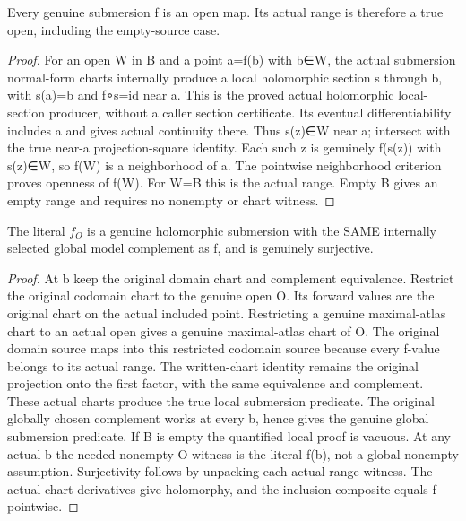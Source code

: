 \begin{lemma}
\label{hir:submersion-image-trace-open}
\leanok
{}
Every genuine submersion f is an open map. Its actual range is therefore a true open, including the empty-source case.
\end{lemma}
\begin{proof}
For an open W in B and a point a=f(b) with b∈W, the actual submersion normal-form charts internally produce a local holomorphic section s through b, with s(a)=b and f∘s=id near a. This is the proved actual holomorphic local-section producer, without a caller section certificate. Its eventual differentiability includes a and gives actual continuity there. Thus s(z)∈W near a; intersect with the true near-a projection-square identity. Each such z is genuinely f(s(z)) with s(z)∈W, so f(W) is a neighborhood of a. The pointwise neighborhood criterion proves openness of f(W). For W=B this is the actual range. Empty B gives an empty range and requires no nonempty or chart witness.
\end{proof}

\begin{lemma}
\label{hir:submersion-image-trace-charts}
\leanok
{}
The literal $f_O$ is a genuine holomorphic submersion with the SAME internally selected global model complement as f, and is genuinely surjective.
\end{lemma}
\begin{proof}
At b keep the original domain chart and complement equivalence. Restrict the original codomain chart to the genuine open O. Its forward values are the original chart on the actual included point. Restricting a genuine maximal-atlas chart to an actual open gives a genuine maximal-atlas chart of O. The original domain source maps into this restricted codomain source because every f-value belongs to its actual range. The written-chart identity remains the original projection onto the first factor, with the same equivalence and complement. These actual charts produce the true local submersion predicate. The original globally chosen complement works at every b, hence gives the genuine global submersion predicate. If B is empty the quantified local proof is vacuous. At any actual b the needed nonempty O witness is the literal f(b), not a global nonempty assumption. Surjectivity follows by unpacking each actual range witness. The actual chart derivatives give holomorphy, and the inclusion composite equals f pointwise.
\end{proof}

